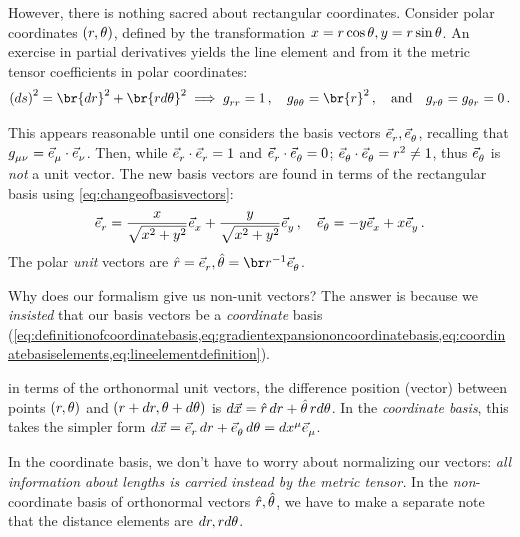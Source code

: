  However, there is nothing sacred about rectangular coordinates. Consider polar coordinates $\tuple{\cxpos,\cypos}$, defined by the transformation $x = r\cos\theta, y= r\sin\theta$. An exercise in partial derivatives yields the line element and from it the metric tensor coefficients in polar coordinates:
%
\begin{equation}\label{eq:euclideanpolarcoordinateslineelementmetric}
  \sqdifdist = \br{d\cxpos}^2 + \br{\cxpos d\cypos}^2 \implies
  \tmetric\cxpos\cxpos = 1 \,,\quad
  \tmetric\cypos\cypos = \br{\cxpos}^2\,,\quad\text{and}\quad
  \tmetric\cxpos\cypos = \tmetric\cypos\cxpos = 0\,.
\end{equation}

 This appears reasonable until one considers the basis vectors $\tbvec\cxpos,\tbvec\cypos$, recalling that $\tmetric\mu\nu = \tbvec\mu\iprod\tbvec\nu$. Then, while $\tbvec\cxpos\iprod\tbvec\cxpos = 1$ and $\tbvec\cxpos\iprod\tbvec\cypos = 0$; $\tbvec\cypos\iprod\tbvec\cypos = \cxpos^2 \neq 1$, thus $\tbvec\cypos$ is \emph{not} a unit vector. The new basis vectors are found in terms of the rectangular basis using \cref{eq:changeofbasisvectors}:
%
\begin{equation}\label{eq:polarbasisinrectangularbasis}
  \tbvec\cxpos = \dfrac{\xpos}{\sqrt{\xpos^2 + \ypos^2}}\tbvec\xpos 
               + \dfrac{\ypos}{\sqrt{\xpos^2 + \ypos^2}}\tbvec\ypos\,,\quad
  \tbvec\cypos = - \ypos\tbvec\xpos + \xpos\tbvec\ypos\,.
\end{equation}
%
The polar \emph{unit} vectors are $\uvec\cxpos = \tbvec\cxpos, \uvec\cypos = \inv\cxpos\tbvec\cypos$.

 Why does our formalism give us non-unit vectors? The answer is because we \emph{insisted} that our basis vectors be a \emph{coordinate} basis (\cref{eq:definitionofcoordinatebasis,eq:gradientexpansiononcoordinatebasis,eq:coordinatebasiselements,eq:lineelementdefinition}). 

 in terms of the orthonormal unit vectors, the difference position (vector) between points $\tuple{\cxpos,\cypos}$ and $\tuple{\cxpos + d\cxpos, \cypos + d\cypos}$ is $d\vec{x} = \hat{r}\,dr + \hat{\theta}\,r d\theta$. In the \emph{coordinate basis}, this takes the simpler form $d\vec\pos = \tbvec\cxpos\,d\cxpos + \tbvec\cypos\,d\cypos = d\tvec\pos\mu\tbvec\mu$.

 In the coordinate basis, we don't have to worry about normalizing our vectors: \emph{all information about lengths is carried instead by the metric tensor.} In the \emph{non}-coordinate basis of orthonormal vectors $\hat{r},\hat{\theta}$, we have to make a separate note that the distance elements are $dr,r d\theta$.

